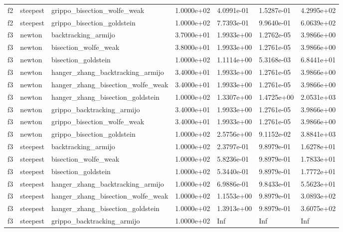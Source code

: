 \documentclass[a4paper,11pt]{article}
\numberwithin{equation}{section} %
\begin{document}
\begin{longtable}{p{1.5cm}|p{1.5cm}|p{4cm}|p{2cm}|p{2cm}|p{2cm}|p{2cm}}
        f2 & steepest & grippo\_bisection\_wolfe\_weak & 1.0000e+02 & 4.0991e-01 & 1.5287e-01 & 4.2995e+02 \\
        f2 & steepest & grippo\_bisection\_goldstein & 1.0000e+02 & 7.7393e-01 & 9.9640e-01 & 6.0639e+02 \\
        f3 & newton & backtracking\_armijo & 3.7000e+01 & 1.9933e+00 & 1.2762e-05 & 3.9866e+00 \\
        f3 & newton & bisection\_wolfe\_weak & 3.8000e+01 & 1.9933e+00 & 1.2761e-05 & 3.9866e+00 \\
        f3 & newton & bisection\_goldstein & 1.0000e+02 & 1.1114e+00 & 5.3168e-03 & 6.8441e+01 \\
        f3 & newton & hanger\_zhang\_backtracking\_armijo & 3.4000e+01 & 1.9933e+00 & 1.2761e-05 & 3.9866e+00 \\
        f3 & newton & hanger\_zhang\_bisection\_wolfe\_weak & 3.4000e+01 & 1.9933e+00 & 1.2761e-05 & 3.9866e+00 \\
        f3 & newton & hanger\_zhang\_bisection\_goldstein & 1.0000e+02 & 1.3307e+00 & 1.4725e+00 & 2.0531e+03 \\
        f3 & newton & grippo\_backtracking\_armijo & 3.4000e+01 & 1.9933e+00 & 1.2761e-05 & 3.9866e+00 \\
        f3 & newton & grippo\_bisection\_wolfe\_weak & 3.4000e+01 & 1.9933e+00 & 1.2761e-05 & 3.9866e+00 \\
        f3 & newton & grippo\_bisection\_goldstein & 1.0000e+02 & 2.5756e+00 & 9.1152e-02 & 3.8841e+03 \\
        f3 & steepest & backtracking\_armijo & 1.0000e+02 & 2.3797e-01 & 9.8979e-01 & 1.6278e+01 \\
        f3 & steepest & bisection\_wolfe\_weak & 1.0000e+02 & 5.8236e-01 & 9.8979e-01 & 1.7833e+01 \\
        f3 & steepest & bisection\_goldstein & 1.0000e+02 & 5.3440e-01 & 9.8979e-01 & 1.7772e+01 \\
        f3 & steepest & hanger\_zhang\_backtracking\_armijo & 1.0000e+02 & 6.9886e-01 & 9.8433e-01 & 5.5623e+01 \\
        f3 & steepest & hanger\_zhang\_bisection\_wolfe\_weak & 1.0000e+02 & 1.1553e+00 & 9.8979e-01 & 3.0893e+02 \\
        f3 & steepest & hanger\_zhang\_bisection\_goldstein & 1.0000e+02 & 1.3913e+00 & 9.8979e-01 & 3.6075e+02 \\
        f3 & steepest & grippo\_backtracking\_armijo & 1.0000e+02 & Inf & Inf & Inf \\

\end{longtable}
\end{document}
